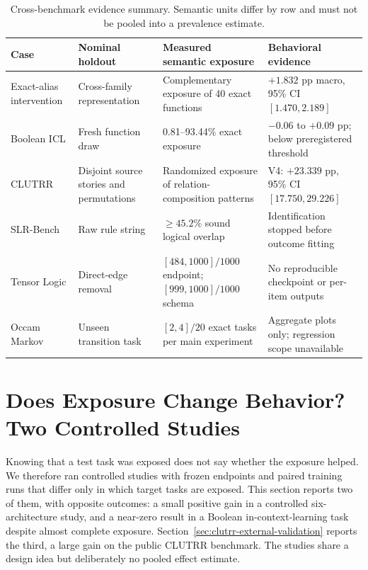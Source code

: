 \documentclass[twoside,11pt]{article}
\begin{document}
\begin{table}[t]
\caption{Cross-benchmark evidence summary.  Semantic units differ by row and
must not be pooled into a prevalence estimate.}
\label{tab:summary}
\centering
\small
\setlength{\tabcolsep}{3.5pt}
\begin{tabular}{L{0.85in}L{1.02in}L{1.70in}L{1.95in}}
\toprule
Case & Nominal holdout & Measured semantic exposure &
Behavioral evidence \\
\midrule
Exact-alias intervention &
Cross-family representation &
Complementary exposure of 40 exact functions &
$+1.832$ pp macro, 95\% CI $[1.470,2.189]$ \\
Boolean ICL &
Fresh function draw &
0.81--93.44\% exact exposure &
$-0.06$ to $+0.09$ pp; below preregistered threshold \\
CLUTRR &
Disjoint source stories and permutations &
Randomized exposure of relation-composition patterns &
V4: $+23.339$ pp, 95\% CI $[17.750,29.226]$ \\
SLR-Bench &
Raw rule string &
$\geq45.2\%$ sound logical overlap &
Identification stopped before outcome fitting \\
Tensor Logic &
Direct-edge removal &
$[484,1000]/1000$ endpoint; $[999,1000]/1000$ schema &
No reproducible checkpoint or per-item outputs \\
Occam Markov &
Unseen transition task &
$[2,4]/20$ exact tasks per main experiment &
Aggregate plots only; regression scope unavailable \\
\bottomrule
\end{tabular}
\end{table}

\section{Does Exposure Change Behavior?  Two Controlled Studies}
\label{sec:behavior}

Knowing that a test task was exposed does not say whether the exposure
helped.  We therefore ran controlled studies with frozen endpoints and
paired training runs that differ only in which target tasks are exposed.
This section reports two of them, with opposite outcomes: a small positive
gain in a controlled six-architecture study, and a near-zero result in a
Boolean in-context-learning task despite almost complete exposure.
Section~\ref{sec:clutrr-external-validation} reports the third, a large
gain on the public CLUTRR benchmark.  The studies share a design idea but
deliberately no pooled effect estimate.
\end{document}
